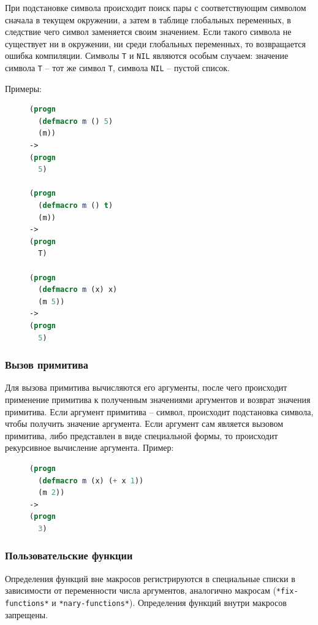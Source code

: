 При подстановке символа происходит поиск пары с соответствующим символом сначала в текущем окружении, а затем в таблице глобальных переменных, в следствие чего символ заменяется своим значением. Если такого символа не существует ни в окружении, ни среди глобальных переменных, то возвращается ошибка компиляции. Символы \texttt{T} и \texttt{NIL} являются особым случаем: значение символа \texttt{T} -- тот же символ \texttt{T}, символа \texttt{NIL} -- пустой список.

Примеры:

\begin{figure}[H]
\begin{lstlisting}[language=Lisp]
(progn
  (defmacro m () 5)
  (m))
->
(progn
  5)

(progn
  (defmacro m () t)
  (m))
->
(progn
  T)

(progn
  (defmacro m (x) x)
  (m 5))
->
(progn
  5)
\end{lstlisting}
\end{figure}

\subsubsection{Вызов примитива}

Для вызова примитива вычисляются его аргументы, после чего происходит применение примитива к полученным значениями аргументов и возврат значения примитива. Если аргумент примитива -- символ, происходит подстановка символа, чтобы получить значение аргумента. Если аргумент сам является вызовом примитива, либо представлен в виде специальной формы, то происходит рекурсивное вычисление аргумента. Пример:

\begin{figure}[H]
\begin{lstlisting}[language=Lisp]
(progn
  (defmacro m (x) (+ x 1))
  (m 2))
->
(progn
  3)
\end{lstlisting}
\end{figure}

\subsubsection{Пользовательские функции}

Определения функций вне макросов регистрируются в специальные списки в зависимости от переменности числа аргументов, аналогично макросам (\texttt{*fix-functions*} и \texttt{*nary-functions*}). Определения функций внутри макросов запрещены.

